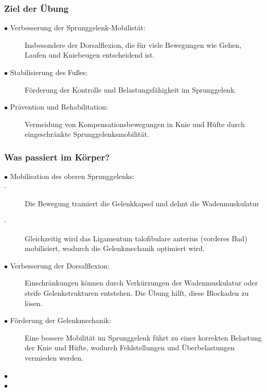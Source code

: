 \subsubsection{Ziel der Übung}

\begin{description}
    \item[$\bullet$ Verbesserung der Sprunggelenk-Mobilistät:]  Insbesondere der Dorsalflexion, die für viele Bewegungen wie Gehen, Laufen und Kniebeugen entscheidend ist.
    \item[$\bullet$ Stabilisierung des Fußes:]  Förderung der Kontrolle und Belastungsfähigkeit im Sprunggelenk.
    \item[$\bullet$ Prävention und Rehabilitation:]  Vermeidung von Kompensationsbewegungen in Knie und Hüfte durch eingeschränkte Sprunggelenksmobilität.
\end{description}

\subsubsection{Was passiert im Körper?}

\begin{description}
    \item[$\bullet$ Mobilisation des oberen Sprunggelenks:]
        \item[$\cdot$]Die Bewegung trainiert die Gelenkkapsel und dehnt die Wadenmuskulatur
        \item[$\cdot$]Gleichzeitig wird das Ligamentum talofibulare anterius (vorderes Bad) mobilisiert, wodurch die Gelenkmechanik optimiert wird.
    \item[$\bullet$ Verbesserung der Dorsalflexion:] Einschränkungen können durch Verkürzungen der Wadenmuskulatur oder steife Gelenkstrukturen entstehen. Die Übung hilft, diese Blockaden zu lösen.
    \item[$\bullet$ Förderung der Gelenkmechanik:] Eine bessere Mobilität im Sprunggelenk führt zu einer korrekten Belastung der Knie und Hüfte, wodurch Fehlstellungen und Überbelastungen vermieden werden.
    \item[$\bullet$]
    \item[$\bullet$]
\end{description}







